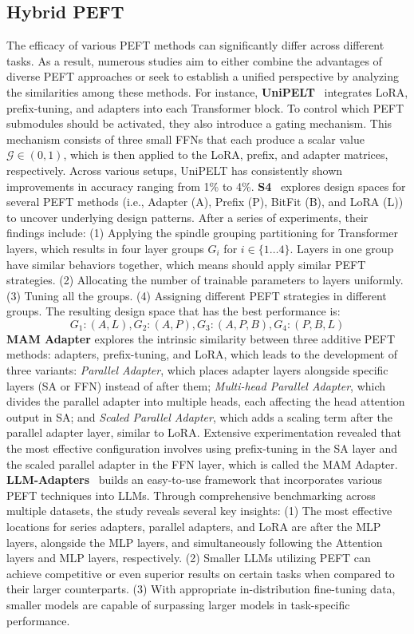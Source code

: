 \subsection{Hybrid PEFT}
\label{sec:hybrid peft}
The efficacy of various PEFT methods can significantly differ across different tasks. As a result, numerous studies aim to either combine the advantages of diverse PEFT approaches or seek to establish a unified perspective by analyzing the similarities among these methods. For instance, 
\textbf{UniPELT}~\cite{15-uni-pelt} integrates LoRA, prefix-tuning, and adapters into each Transformer block. To control which PEFT submodules should be activated, they also introduce a gating mechanism. This mechanism consists of three small FFNs that each produce a scalar value $\mathcal{G} \in (0, 1)$, which is then applied to the LoRA, prefix, and adapter matrices, respectively. Across various setups, UniPELT has consistently shown improvements in accuracy ranging from 1\% to 4\%. 
\textbf{S4}~\cite{chen2023parameter} explores design spaces for several PEFT methods (i.e., Adapter (A), Prefix (P), BitFit (B), and LoRA (L)) to uncover underlying design patterns. After a series of experiments, their findings include: (1) Applying the spindle grouping partitioning for Transformer layers, which results in four layer groups $G_i$ for $i \in \{1 \dots 4\}$. Layers in one group have similar behaviors together, which means should apply similar PEFT strategies. (2) Allocating the number of trainable parameters to layers uniformly. (3) Tuning all the groups. (4) Assigning different PEFT strategies in different groups. The resulting design space that has the best performance is:
$$
G_1: (A, L), G_2: (A, P), G_3: (A, P, B), G_4:(P, B, L)
$$
\textbf{MAM Adapter}\cite{14-unified-view-transfer-peft} explores the intrinsic similarity between three additive PEFT methods: adapters, prefix-tuning, and LoRA, which leads to the development of three variants: \emph{Parallel Adapter}, which places adapter layers alongside specific layers (SA or FFN) instead of after them; \emph{Multi-head Parallel Adapter}, which divides the parallel adapter into multiple heads, each affecting the head attention output in SA; and \emph{Scaled Parallel Adapter}, which adds a scaling term after the parallel adapter layer, similar to LoRA. Extensive experimentation revealed that the most effective configuration involves using prefix-tuning in the SA layer and the scaled parallel adapter in the FFN layer, which is called the MAM Adapter. 
\textbf{LLM-Adapters}~\cite{hu2023llm} builds an easy-to-use framework that incorporates various PEFT techniques into LLMs. Through comprehensive benchmarking across multiple datasets, the study reveals several key insights: (1) The most effective locations for series adapters, parallel adapters, and LoRA are after the MLP layers, alongside the MLP layers, and simultaneously following the Attention layers and MLP layers, respectively. (2) Smaller LLMs utilizing PEFT can achieve competitive or even superior results on certain tasks when compared to their larger counterparts. (3) With appropriate in-distribution fine-tuning data, smaller models are capable of surpassing larger models in task-specific performance.



